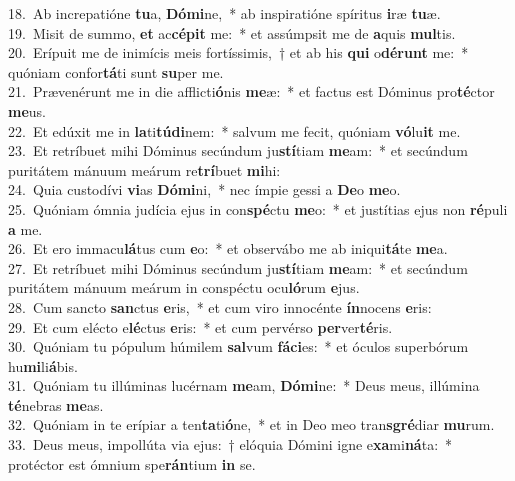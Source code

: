 {18.~}Ab increpatióne \textbf{tu}a, \textbf{Dó}\textbf{mi}ne,~* ab inspiratióne spíritus \textbf{i}ræ \textbf{tu}æ.\\
{19.~}Misit de summo, \textbf{et} ac\textbf{cé}\textbf{pit} me:~* et assúmpsit me de \textbf{a}quis \textbf{mul}tis.\\
{20.~}Erípuit me de inimícis meis fortíssimis,~† et ab his \textbf{qui} o\textbf{dé}\textbf{runt} me:~* quóniam confor\textbf{tá}ti sunt \textbf{su}per me.\\
{21.~}Prævenérunt me in die afflicti\textbf{ó}nis \textbf{me}æ:~* et factus est Dóminus pro\textbf{té}ctor \textbf{me}us.\\
{22.~}Et edúxit me in \textbf{la}ti\textbf{tú}\textbf{di}nem:~* salvum me fecit, quóniam \textbf{vó}lu\textbf{it} me.\\
{23.~}Et retríbuet mihi Dóminus secúndum ju\textbf{stí}tiam \textbf{me}am:~* et secúndum puritátem mánuum meárum re\textbf{trí}buet \textbf{mi}hi:\\
{24.~}Quia custodívi \textbf{vi}as \textbf{Dó}\textbf{mi}ni,~* nec ímpie gessi a \textbf{De}o \textbf{me}o.\\
{25.~}Quóniam ómnia judícia ejus in con\textbf{spé}ctu \textbf{me}o:~* et justítias ejus non \textbf{ré}puli \textbf{a} me.\\
{26.~}Et ero immacu\textbf{lá}tus cum \textbf{e}o:~* et observábo me ab iniqui\textbf{tá}te \textbf{me}a.\\
{27.~}Et retríbuet mihi Dóminus secúndum ju\textbf{stí}tiam \textbf{me}am:~* et secúndum puritátem mánuum meárum in conspéctu ocu\textbf{ló}rum \textbf{e}jus.\\
{28.~}Cum sancto \textbf{san}ctus \textbf{e}ris,~* et cum viro innocénte \textbf{ín}nocens \textbf{e}ris:\\
{29.~}Et cum elécto e\textbf{lé}ctus \textbf{e}ris:~* et cum pervérso \textbf{per}ver\textbf{té}ris.\\
{30.~}Quóniam tu pópulum húmilem \textbf{sal}vum \textbf{fá}\textbf{ci}es:~* et óculos superbórum hu\textbf{mi}li\textbf{á}bis.\\
{31.~}Quóniam tu illúminas lucérnam \textbf{me}am, \textbf{Dó}\textbf{mi}ne:~* Deus meus, illúmina \textbf{té}nebras \textbf{me}as.\\
{32.~}Quóniam in te erípiar a ten\textbf{ta}ti\textbf{ó}ne,~* et in Deo meo tran\textbf{sgré}diar \textbf{mu}rum.\\
{33.~}Deus meus, impollúta via ejus:~† elóquia Dómini igne e\textbf{xa}mi\textbf{ná}ta:~* protéctor est ómnium spe\textbf{rán}tium \textbf{in} se.\\

